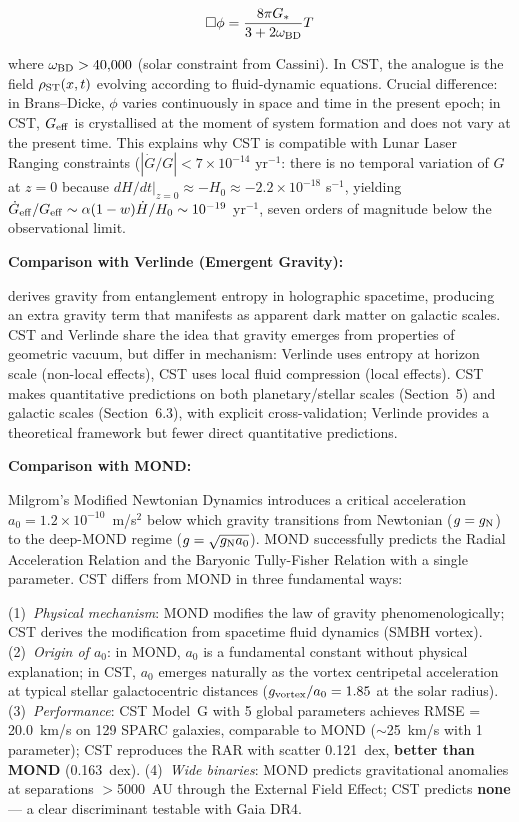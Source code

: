 \documentclass[11pt,a4paper]{article}
\begin{document}
\[\Box\phi = \frac{8\pi G_*}{3+2\omega_{\rm BD}} T\]

where \(\omega_{\rm BD} > 40{,}000\) (solar constraint from Cassini). In
CST, the analogue is the field \(\rho_{\rm ST}(x,t)\) evolving according
to fluid-dynamic equations. Crucial difference: in Brans--Dicke,
\(\phi\) varies continuously in space and time in the present epoch; in
CST, \(G_{\rm eff}\) is crystallised at the moment of system formation
and does not vary at the present time. This explains why CST is
compatible with Lunar Laser Ranging constraints
(\(|\dot G/G| < 7\times10^{-14}\) yr\(^{-1}\): there is no temporal
variation of \(G\) at \(z = 0\) because
\(dH/dt|_{z=0} \approx -H_0 \approx -2.2\times10^{-18}\) s\(^{-1}\),
yielding
\(\dot G_{\rm eff}/G_{\rm eff} \sim \alpha (1-w) \dot H/H_0 \sim 10^{-19}\)
yr\(^{-1}\), seven orders of magnitude below the observational limit.

\textbf{Comparison with Verlinde (Emergent Gravity):}

\cite{Verlinde2017} derives gravity from entanglement entropy in holographic
spacetime, producing an extra gravity term that manifests as apparent
dark matter on galactic scales. CST and Verlinde share the idea that
gravity emerges from properties of geometric vacuum, but differ in
mechanism: Verlinde uses entropy at horizon scale (non-local effects),
CST uses local fluid compression (local effects). CST makes quantitative
predictions on both planetary/stellar scales (Section~5) and galactic scales (Section~6.3), with explicit cross-validation; Verlinde provides a theoretical framework but fewer direct quantitative predictions.

\textbf{Comparison with MOND:}

Milgrom's Modified Newtonian Dynamics \cite{Milgrom1983} introduces a critical acceleration $a_0 = 1.2 \times 10^{-10}$~m/s$^2$ below which gravity transitions from Newtonian ($g = g_{\rm N}$) to the deep-MOND regime ($g = \sqrt{g_{\rm N} a_0}$). MOND successfully predicts the Radial Acceleration Relation and the Baryonic Tully-Fisher Relation with a single parameter. CST differs from MOND in three fundamental ways:

(1)~\textit{Physical mechanism}: MOND modifies the law of gravity phenomenologically; CST derives the modification from spacetime fluid dynamics (SMBH vortex). (2)~\textit{Origin of $a_0$}: in MOND, $a_0$ is a fundamental constant without physical explanation; in CST, $a_0$ emerges naturally as the vortex centripetal acceleration at typical stellar galactocentric distances ($g_{\rm vortex}/a_0 = 1.85$ at the solar radius). (3)~\textit{Performance}: CST Model~G with 5 global parameters achieves RMSE = 20.0~km/s on 129 SPARC galaxies, comparable to MOND ($\sim$25~km/s with 1 parameter); CST reproduces the RAR with scatter 0.121~dex, \textbf{better than MOND} (0.163~dex). (4)~\textit{Wide binaries}: MOND predicts gravitational anomalies at separations $>$5000~AU through the External Field Effect; CST predicts \textbf{none} --- a clear discriminant testable with Gaia DR4.
\end{document}

